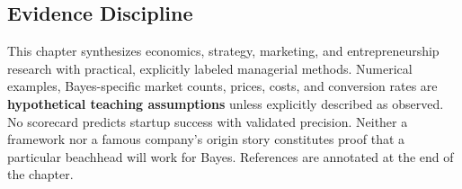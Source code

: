 \subsection*{Evidence Discipline}

This chapter synthesizes economics, strategy, marketing, and entrepreneurship research with practical, explicitly labeled managerial methods. Numerical examples, Bayes-specific market counts, prices, costs, and conversion rates are \textbf{hypothetical teaching assumptions} unless explicitly described as observed. No scorecard predicts startup success with validated precision. Neither a framework nor a famous company's origin story constitutes proof that a particular beachhead will work for Bayes. References are annotated at the end of the chapter.
